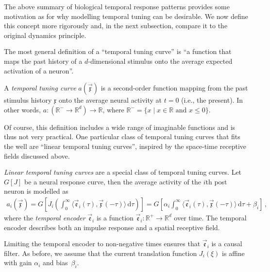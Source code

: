 The above summary of biological temporal response patterns provides some motivation as for why modelling temporal tuning can be desirable.
We now define this concept more rigorously and, in the next subsection, compare it to the original \NEF dynamics principle.

The most general definition of a \enquote{temporal tuning curve} is \enquote{a function that maps the past history of a $d$-dimensional stimulus onto the average expected activation of a neuron}.

\begin{definition}
	\label{def:temporal_tuning_curve}
	A \emph{temporal tuning curve} $a(\vec{\mathfrak{x}})$ is a second-order function mapping from the past stimulus history $\mathfrak{x}$ onto the average neural activity at $t = 0$ (i.e., the present).
	In other words, $a : (\mathbb{R}^- \longrightarrow \mathbb{R}^d) \longrightarrow \mathbb{R}$, where $\mathbb{R}^- = \{ x \mid x \in \mathbb{R} \text{ and } x \leq 0 \}$.
\end{definition}

Of course, this definition includes a wide range of imaginable functions and is thus not very practical.
One particular class of temporal tuning curves that fits the \NEF well are \enquote{linear temporal tuning curves}, inspired by the space-time receptive fields discussed above.

\begin{definition}
	\label{def:linear_temporal_tuning}
	\emph{Linear temporal tuning curves} are a special class of temporal tuning curves.
	Let $G[J]$ be a neural response curve, then the average activity of the $i$th post neuron is modelled as
	\begin{align}
		a_i(\vec{\mathfrak{x}})
			= G\left[ J_i \left( \int_{0}^\infty \!\!\! \big\langle \vec{\mathfrak{e}}_i(\tau), \vec{\mathfrak{x}}(-\tau) \big\rangle 	\,\mathrm{d}\tau \right) \right]
		= G\left[ \alpha_i \! \int_{0}^\infty \!\!\! \big\langle \vec{\mathfrak{e}}_i(\tau), \vec{\mathfrak{x}}(-\tau) \big\rangle \,\mathrm{d}\tau + \beta_i \right] \,,
		\label{eqn:temporal_tuning_curve}
	\end{align}
	where the \emph{temporal encoder} $\vec{\mathfrak{e}}_i$ is a function $\vec{\mathfrak{e}}_i : \mathbb{R}^+ \longrightarrow \mathbb{R}^d$ over time. The temporal encoder describes both an impulse response and a spatial receptive field.
\end{definition}
\noindent Limiting the temporal encoder to non-negative times ensures that $\vec{\mathfrak{e}}_i$ is a causal filter.
As before, we assume that the current translation function $J_i(\xi)$ is affine with gain $\alpha_i$ and bias~$\beta_i$.

